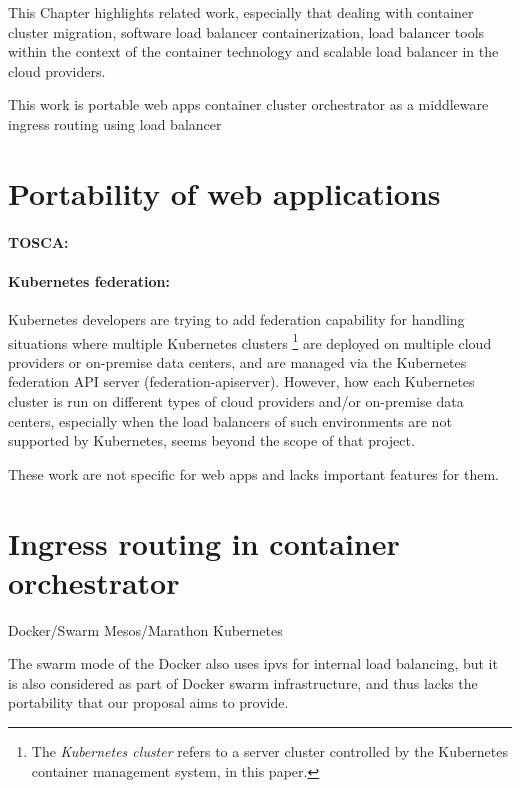 This Chapter highlights related work, especially that dealing with container cluster migration, 
software load balancer containerization, load balancer tools within the context of the container technology and scalable load balancer in the cloud providers.


This work is 
portable web apps
container cluster
orchestrator as a middleware
ingress routing using load balancer

\section{Portability of web applications}

\paragraph{\bf TOSCA:}



\paragraph{\bf Kubernetes federation:}

Kubernetes developers are trying to add federation \cite{K8sFederation2017} capability for handling situations 
where multiple Kubernetes clusters \footnote{The {\em Kubernetes cluster} refers to a server cluster 
controlled by the Kubernetes container management system, in this paper.} 
are deployed on multiple cloud providers or on-premise data centers, 
and are managed via the Kubernetes federation API server (federation-apiserver). 
However, how each Kubernetes cluster is run on different types of cloud providers
and/or on-premise data centers, especially when the load balancers of such environments are not supported by Kubernetes, 
seems beyond the scope of that project. 

These work are not specific for web apps and lacks important features for them.

\section{Ingress routing in container orchestrator}

Docker/Swarm
Mesos/Marathon
Kubernetes

The swarm mode of the Docker\cite{DockerCoreEngineering2016,DockerInc2017} also uses ipvs for internal load balancing,
but it is also considered as part of Docker swarm infrastructure, 
and thus lacks the portability that our proposal aims to provide.

